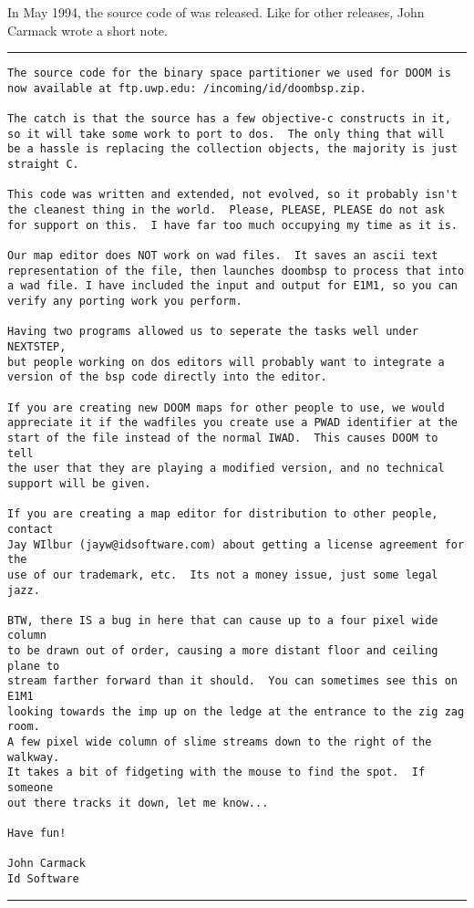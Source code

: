 In May 1994, the source code of  was released. Like for other releases, John Carmack wrote a short note. \\
\par
\vspace{10pt} 
\hrule \par
\begin{verbatim}
The source code for the binary space partitioner we used for DOOM is 
now available at ftp.uwp.edu: /incoming/id/doombsp.zip.

The catch is that the source has a few objective-c constructs in it, 
so it will take some work to port to dos.  The only thing that will 
be a hassle is replacing the collection objects, the majority is just 
straight C.

This code was written and extended, not evolved, so it probably isn't
the cleanest thing in the world.  Please, PLEASE, PLEASE do not ask 
for support on this.  I have far too much occupying my time as it is.

Our map editor does NOT work on wad files.  It saves an ascii text 
representation of the file, then launches doombsp to process that into
a wad file. I have included the input and output for E1M1, so you can
verify any porting work you perform.

Having two programs allowed us to seperate the tasks well under NEXTSTEP,
but people working on dos editors will probably want to integrate a 
version of the bsp code directly into the editor.

If you are creating new DOOM maps for other people to use, we would 
appreciate it if the wadfiles you create use a PWAD identifier at the 
start of the file instead of the normal IWAD.  This causes DOOM to tell 
the user that they are playing a modified version, and no technical 
support will be given.

If you are creating a map editor for distribution to other people, contact
Jay WIlbur (jayw@idsoftware.com) about getting a license agreement for the
use of our trademark, etc.  Its not a money issue, just some legal jazz.

BTW, there IS a bug in here that can cause up to a four pixel wide column 
to be drawn out of order, causing a more distant floor and ceiling plane to
stream farther forward than it should.  You can sometimes see this on E1M1
looking towards the imp up on the ledge at the entrance to the zig zag room.
A few pixel wide column of slime streams down to the right of the walkway.
It takes a bit of fidgeting with the mouse to find the spot.  If someone
out there tracks it down, let me know...

Have fun!

John Carmack
Id Software

\end{verbatim}
\par \hrule
